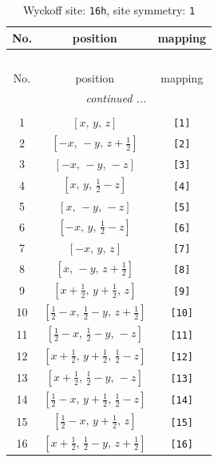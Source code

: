 \documentclass[fleqn,8pt]{jsarticle}
\begin{document}
\begin{longtable}{ccc}
\caption{Wyckoff site: {\tt 16h}, site symmetry: {\tt 1}}
 \\
 \hline \hline
No. & position & mapping \\ \hline \endfirsthead

\multicolumn{2}{l}{\tablename\ \thetable{}} \\
 \hline \hline
No. & position & mapping \\ \hline \endhead

 \hline \hline
\multicolumn{2}{r}{\footnotesize\it continued ...} \\ \endfoot

 \hline \hline
\multicolumn{2}{r}{} \\ \endlastfoot

1 & $\left[ x,\, y,\, z \right]$ & {\tt [1]} \\ \hline
2 & $\left[ - x,\, - y,\, z + \frac{1}{2} \right]$ & {\tt [2]} \\ \hline
3 & $\left[ - x,\, - y,\, - z \right]$ & {\tt [3]} \\ \hline
4 & $\left[ x,\, y,\, \frac{1}{2} - z \right]$ & {\tt [4]} \\ \hline
5 & $\left[ x,\, - y,\, - z \right]$ & {\tt [5]} \\ \hline
6 & $\left[ - x,\, y,\, \frac{1}{2} - z \right]$ & {\tt [6]} \\ \hline
7 & $\left[ - x,\, y,\, z \right]$ & {\tt [7]} \\ \hline
8 & $\left[ x,\, - y,\, z + \frac{1}{2} \right]$ & {\tt [8]} \\ \hline
9 & $\left[ x + \frac{1}{2},\, y + \frac{1}{2},\, z \right]$ & {\tt [9]} \\ \hline
10 & $\left[ \frac{1}{2} - x,\, \frac{1}{2} - y,\, z + \frac{1}{2} \right]$ & {\tt [10]} \\ \hline
11 & $\left[ \frac{1}{2} - x,\, \frac{1}{2} - y,\, - z \right]$ & {\tt [11]} \\ \hline
12 & $\left[ x + \frac{1}{2},\, y + \frac{1}{2},\, \frac{1}{2} - z \right]$ & {\tt [12]} \\ \hline
13 & $\left[ x + \frac{1}{2},\, \frac{1}{2} - y,\, - z \right]$ & {\tt [13]} \\ \hline
14 & $\left[ \frac{1}{2} - x,\, y + \frac{1}{2},\, \frac{1}{2} - z \right]$ & {\tt [14]} \\ \hline
15 & $\left[ \frac{1}{2} - x,\, y + \frac{1}{2},\, z \right]$ & {\tt [15]} \\ \hline
16 & $\left[ x + \frac{1}{2},\, \frac{1}{2} - y,\, z + \frac{1}{2} \right]$ & {\tt [16]} \\
\end{longtable}
\end{document}
